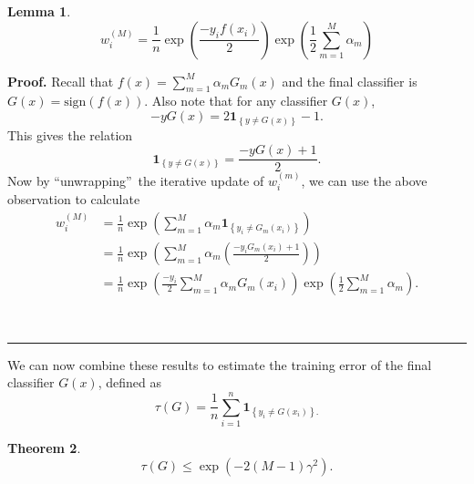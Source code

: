 \documentclass[11pt,twoside]{article}%
\theoremstyle{change}
\newtheorem{theorem}{Theorem}[section]
\newtheorem{lemma}[theorem]{Lemma}
\newenvironment{proof}[1][Proof]{\textbf{#1.} }{\ \rule{0.5em}{0.5em}}
\begin{document}
\begin{lemma}%
\[
w_{i}^{(M)}=\frac{1}{n}\exp\left(  \frac{-y_{i}f(x_{i})}{2}\right)
\exp\left(  \frac{1}{2}\sum_{m=1}^{M}\alpha_{m}\right)
\]

\end{lemma}

\begin{proof}
Recall that $f(x)=\sum_{m=1}^{M}\alpha_{m}G_{m}(x)$ and the final classifier
is $G(x)=\mathrm{sign}\left(  f(x)\right)  $. Also note that for any
classifier $G(x)$,%
\[
-yG(x)=2\mathbf{1}_{\left\{  y\neq G(x)\right\}  }-1.
\]
This gives the relation%
\[
\mathbf{1}_{\left\{  y\neq G(x)\right\}  }=\frac{-yG(x)+1}{2}.
\]
Now by \textquotedblleft unwrapping\textquotedblright\ the iterative update of
$w_{i}^{(m)}$, we can use the above observation to calculate%
\begin{align*}
w_{i}^{(M)}  & =\frac{1}{n}\exp\left(  \sum_{m=1}^{M}\alpha_{m}\mathbf{1}%
_{\left\{  y_{i}\neq G_{m}(x_{i})\right\}  }\right) \\
& =\frac{1}{n}\exp\left(  \sum_{m=1}^{M}\alpha_{m}\left(  \frac{-y_{i}%
G_{m}(x_{i})+1}{2}\right)  \right) \\
& =\frac{1}{n}\exp\left(  \frac{-y_{i}}{2}\sum_{m=1}^{M}\alpha_{m}G_{m}%
(x_{i})\right)  \exp\left(  \frac{1}{2}\sum_{m=1}^{M}\alpha_{m}\right)  .
\end{align*}

\end{proof}

We can now combine these results to estimate the training error of the final
classifier $G(x)$, defined as%
\[
\tau(G)=\frac{1}{n}\sum_{i=1}^{n}\mathbf{1}_{\left\{  y_{i}\neq G(x_{i}%
)\right\}  .}%
\]


\begin{theorem}%
\[
\tau(G)\leq\exp\left(  -2(M-1)\gamma^{2}\right)  .
\]

\end{theorem}
\end{document}
